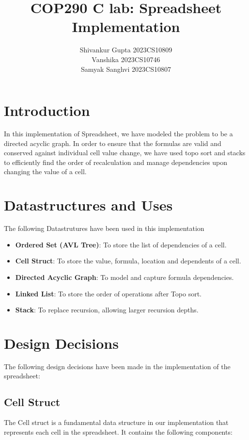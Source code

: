 \documentclass[10pt,a4paper]{article}  %
\title{COP290 C lab: Spreadsheet Implementation}
\author{Shivankur Gupta 2023CS10809\\ Vanshika 2023CS10746\\ Samyak Sanghvi 2023CS10807}
\begin{document}
\maketitle



\tableofcontents

\section{Introduction}
In this implementation of Spreadsheet, we have modeled the problem to be a directed acyclic graph. In order to ensure that the formulas are valid and conserved against individual cell value change, we have used topo sort and stacks to efficiently find the order of recalculation and manage dependencies upon changing the value of a cell.

\section{Datastructures and Uses}
The following Datastrutures have been used in this implementation

\begin{itemize}
    \item \textbf{Ordered Set (AVL Tree)}: To store the list of dependencies of a cell.
    \item \textbf{Cell Struct}: To store the value, formula, location and dependents of a cell.
    \item \textbf{Directed Acyclic Graph}: To model and capture formula dependencies.
    \item \textbf{Linked List}: To store the order of operations after Topo sort.
    \item \textbf{Stack}: To replace recursion, allowing larger recursion depths.
\end{itemize}



\section{Design Decisions}
The following design decisions have been made in the implementation of the spreadsheet:
\subsection{Cell Struct}
The Cell struct is a fundamental data structure in our implementation that represents each cell in the spreadsheet. It contains the following components:
\end{document}
